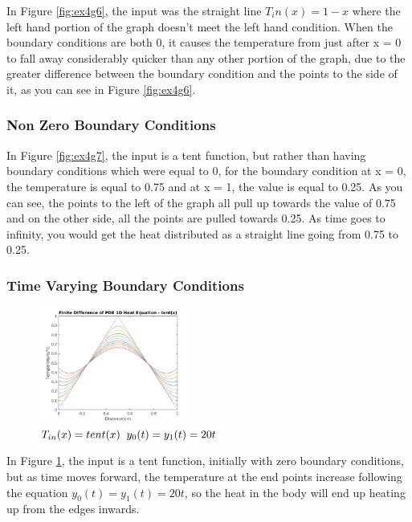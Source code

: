 \documentclass[11pt,a4paper]{article}
\begin{document}
In Figure \ref{fig:ex4g6}, the input was the straight line $T_in(x) = 1-x$ where the left hand portion of the graph doesn't meet the left hand condition. When the boundary conditions are both 0, it causes the temperature from just after x = 0 to fall away considerably quicker than any other portion of the graph, due to the greater difference between the boundary condition and the points to the side of it, as you can see in Figure \ref{fig:ex4g6}.

\subsubsection{Non Zero Boundary Conditions}

In Figure \ref{fig:ex4g7}, the input is a tent function, but rather than having boundary conditions which were equal to 0, for the boundary condition at x = 0, the temperature is equal to 0.75 and at x = 1, the value is equal to 0.25. As you can see, the points to the left of the graph all pull up towards the value of 0.75 and on the other side, all the points are pulled towards 0.25. As time goes to infinity, you would get the heat distributed as a straight line going from 0.75 to 0.25.

\pagebreak

\subsubsection{Time Varying Boundary Conditions}

\begin{figure}
	\vspace{-6mm}
	\includegraphics[width=0.45\textwidth]{Ex4_Figs/timevar.png}
	\vspace{-3mm}
	\caption{$T_{in}(x)= tent(x) \hspace{2mm} y_0(t) = y_1(t) = 20t$}
	\label{fig:ex4g8}
\end{figure}

In Figure \ref{fig:ex4g8}, the input is a tent function, initially with zero boundary conditions, but as time moves forward, the temperature at the end points increase following the equation $y_0(t) = y_1(t) = 20t$, so the heat in the body will end up heating up from the edges inwards.
\end{document}
